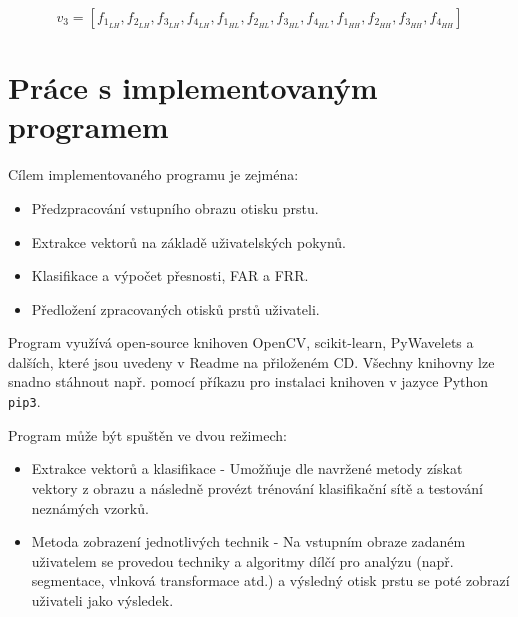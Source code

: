 $$v_3 = [f_{1_{LH}}, f_{2_{LH}}, f_{3_{LH}}, f_{4_{LH}}, f_{1_{HL}}, f_{2_{HL}}, f_{3_{HL}}, f_{4_{HL}}, f_{1_{HH}}, f_{2_{HH}}, f_{3_{HH}}, f_{4_{HH}}]$$

\section{Práce s implementovaným programem}
Cílem implementovaného programu je zejména:
\begin{itemize}
    \item Předzpracování vstupního obrazu otisku prstu.
    \item Extrakce vektorů na základě uživatelských pokynů.
    \item Klasifikace a výpočet přesnosti, FAR a FRR.
    \item Předložení zpracovaných otisků prstů uživateli.
\end{itemize}

Program využívá open-source knihoven OpenCV, scikit-learn, PyWavelets a dalších, které jsou uvedeny v Readme na přiloženém CD. Všechny knihovny lze snadno stáhnout např. pomocí příkazu pro instalaci knihoven v jazyce Python \verb|pip3|. 

Program může být spuštěn ve dvou režimech:
\begin{itemize}
    \item Extrakce vektorů a klasifikace - Umožňuje dle navržené metody získat vektory z obrazu a následně provézt trénování klasifikační sítě a testování neznámých vzorků.
    \item Metoda zobrazení jednotlivých technik - Na vstupním obraze zadaném uživatelem se provedou techniky a algoritmy dílčí pro analýzu (např. segmentace, vlnková transformace atd.) a výsledný otisk prstu se poté zobrazí uživateli jako výsledek.
\end{itemize}

